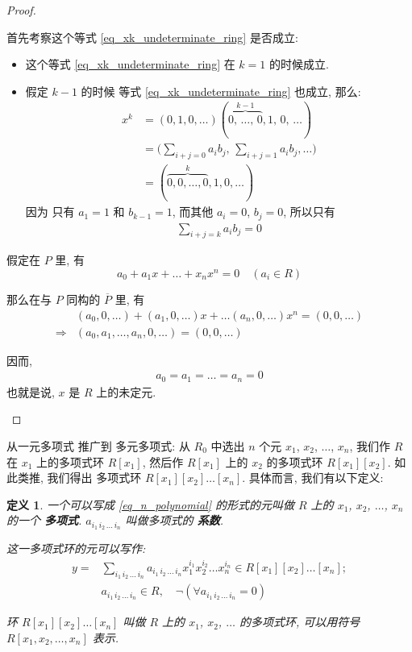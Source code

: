 \documentclass[utf8]{ctexbook}
\newtheorem{definition}{定义}[section]
\begin{document}
\begin{proof}
\begin{enumerate}
{首先考察这个等式 \ref{eq_xk_undeterminate_ring} 是否成立:
\begin{itemize}
\item{这个等式 \ref{eq_xk_undeterminate_ring} 在 $k=1$ 的时候成立.}
\item{假定 $k-1$ 的时候 等式 \ref{eq_xk_undeterminate_ring} 也成立, 那么:
\begin{align*}
x^k & = (0, 1, 0, \ldots) (  \overbrace{0, \, \ldots, \, 0}^{k-1},  1, \, 0, \, \ldots )  \\
 & = \Big( \sum_{i+j = 0} a_i b_j, \, \sum_{i+j=1} a_i b_j ,\ldots \Big) \\
 & = (\overbrace{0, 0, \ldots, 0}^{k} , 1, 0, \ldots )
\end{align*}
因为 只有 $a_1 =1 $ 和  $b_{k-1} =1 $, 而其他 $a_i =0$, $b_j = 0$, 所以只有
\begin{align*}
\sum_{i+j = k} a_i b_j = 0
\end{align*}
}
\end{itemize}

假定在 $P$ 里, 有
\begin{equation}
a_0 + a_1 x + \ldots + x_n x^n = 0 \quad (a_i \in R) \nonumber
\end{equation}

那么在与 $P$ 同构的 $\overline{P}$ 里, 有
\begin{align*}
& (a_0, 0, \ldots ) + (a_1, 0, \ldots ) x + \ldots (a_n, 0, \ldots ) x^n = (0, 0, \ldots) \\
\Longrightarrow & (a_0, a_1, \ldots , a_n, 0, \ldots) = (0,0, \ldots )
\end{align*}

因而,
\begin{align*}
a_0 = a_1 = \ldots = a_n = 0
\end{align*}
也就是说, $x$ 是 $R$ 上的未定元.
}
\end{enumerate}

\end{proof}

从一元多项式 推广到 多元多项式: 从 $R_0$ 中选出 $n$ 个元 $x_1$, $x_2$, $\ldots$, $x_n$, 我们作 $R$ 在 $x_1$ 上的多项式环 $R[x_1]$, 然后作  $R[x_1]$ 上的 $x_2$ 的多项式环 $R[x_1][x_2]$. 如此类推, 我们得出 多项式环 $R[x_1][x_2]\ldots[x_n]$. 具体而言, 我们有以下定义:

\begin{definition}
一个可以写成 \ref{eq_n_polynomial} 的形式的元叫做 $R$ 上的 $x_1$, $x_2$, $\ldots$, $x_n$ 的一个 \textbf{多项式}. $a_{i_1 \, i_2 \, \ldots \, i_n} $ 叫做多项式的 \textbf{系数}.

这一多项式环的元可以写作:
\begin{align}
 y = & \sum_{i_1 \, i_2 \, \ldots \, i_n} a_{i_1 \, i_2 \, \ldots \, i_n} x_1 ^{i_1} x_2 ^{i_2} \ldots x_n ^{i_n}  \in R[x_1][x_2]\ldots[x_n] ; \label{eq_n_polynomial} \\
& a_{i_1 \, i_2 \, \ldots \, i_n} \in R, \quad \lnot ( \forall a_{i_1 \, i_2 \, \ldots \, i_n} = 0 ) \nonumber
\end{align}

环 $R[x_1][x_2]\ldots[x_n]$ 叫做 $R$ 上的 $x_1$, $x_2$, $\ldots$ 的多项式环, 可以用符号 $R[x_1, x_2, \ldots, x_n]$ 表示.
\end{definition}
\end{document}

